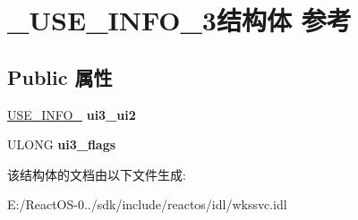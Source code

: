 \hypertarget{struct___u_s_e___i_n_f_o__3}{}\section{\+\_\+\+U\+S\+E\+\_\+\+I\+N\+F\+O\+\_\+3结构体 参考}
\label{struct___u_s_e___i_n_f_o__3}
\subsection*{Public 属性}
\begin{DoxyCompactItemize}
\item 
\mbox{\label{struct___u_s_e___i_n_f_o__3_aa3214f0033f3efb8eee172bbb313ef06}} 
\hyperlink{struct___u_s_e___i_n_f_o__2}{U\+S\+E\+\_\+\+I\+N\+F\+O\+\_} {\bfseries ui3\+\_\+ui2}
\item 
\mbox{\label{struct___u_s_e___i_n_f_o__3_a0d2a7026255f3131271295e769d6e2fa}} 
U\+L\+O\+NG {\bfseries ui3\+\_\+flags}
\end{DoxyCompactItemize}


该结构体的文档由以下文件生成\+:\begin{DoxyCompactItemize}
\item 
E\+:/\+React\+O\+S-\/0../sdk/include/reactos/idl/wkssvc.\+idl\end{DoxyCompactItemize}
